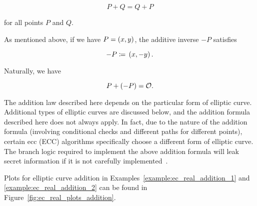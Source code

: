 \begin{equation}
    P + Q = Q + P
\end{equation}

\noindent
for all points $P$ and $Q$.

As mentioned above, if we have $P = \left( x,y \right)$,
the additive inverse $-P$ satisfies

\begin{equation}
    -P \coloneqq{} \left( x,-y \right).
\end{equation}

\noindent
Naturally, we have

\begin{equation}
    P + \left( -P \right) = \mathcal{O}.
\end{equation}

The addition law described here depends on the particular form
of \gls{elliptic curve}.
Additional types of \glspl{elliptic curve} are discussed below,
and the addition formula described here does not always apply.
In fact, due to the nature of the addition formula
(involving conditional checks and different paths for different points),
certain \gls{ecc} (ECC) algorithms specifically
choose a different form of \gls{elliptic curve}.
The branch logic required to implement the above addition formula
will leak secret information if it is not
carefully implemented~\cite{brumley2011remote}.

Plots for elliptic curve addition in
Examples~\ref{example:ec_real_addition_1}
and \ref{example:ec_real_addition_2}
can be found in Figure~\ref{fig:ec_real_plots_addition}.



